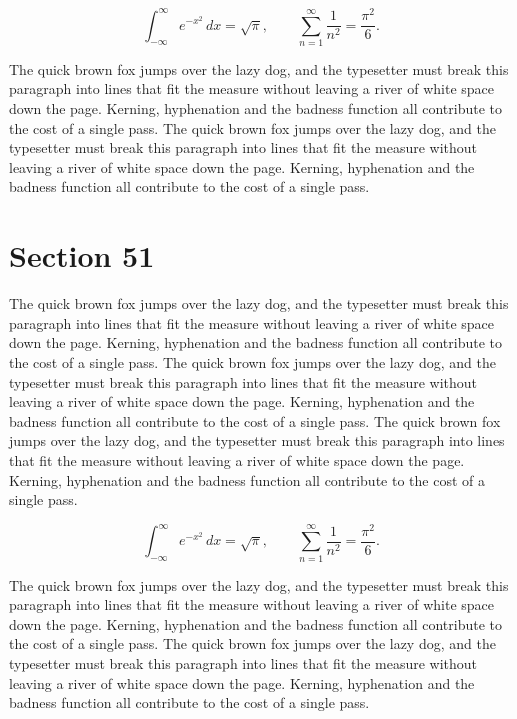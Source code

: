 \documentclass{article}
\begin{document}
\begin{equation}
\int_{-\infty}^{\infty} e^{-x^{2}}\,dx = \sqrt{\pi}, \qquad
\sum_{n=1}^{\infty} \frac{1}{n^{2}} = \frac{\pi^{2}}{6}.
\end{equation}

The quick brown fox jumps over the lazy dog, and the typesetter must break this paragraph into lines that fit the measure without leaving a river of white space down the page. Kerning, hyphenation and the badness function all contribute to the cost of a single pass. The quick brown fox jumps over the lazy dog, and the typesetter must break this paragraph into lines that fit the measure without leaving a river of white space down the page. Kerning, hyphenation and the badness function all contribute to the cost of a single pass. 
\section{Section 51}
The quick brown fox jumps over the lazy dog, and the typesetter must break this paragraph into lines that fit the measure without leaving a river of white space down the page. Kerning, hyphenation and the badness function all contribute to the cost of a single pass. The quick brown fox jumps over the lazy dog, and the typesetter must break this paragraph into lines that fit the measure without leaving a river of white space down the page. Kerning, hyphenation and the badness function all contribute to the cost of a single pass. The quick brown fox jumps over the lazy dog, and the typesetter must break this paragraph into lines that fit the measure without leaving a river of white space down the page. Kerning, hyphenation and the badness function all contribute to the cost of a single pass. 

\begin{equation}
\int_{-\infty}^{\infty} e^{-x^{2}}\,dx = \sqrt{\pi}, \qquad
\sum_{n=1}^{\infty} \frac{1}{n^{2}} = \frac{\pi^{2}}{6}.
\end{equation}

The quick brown fox jumps over the lazy dog, and the typesetter must break this paragraph into lines that fit the measure without leaving a river of white space down the page. Kerning, hyphenation and the badness function all contribute to the cost of a single pass. The quick brown fox jumps over the lazy dog, and the typesetter must break this paragraph into lines that fit the measure without leaving a river of white space down the page. Kerning, hyphenation and the badness function all contribute to the cost of a single pass. 
\end{document}
